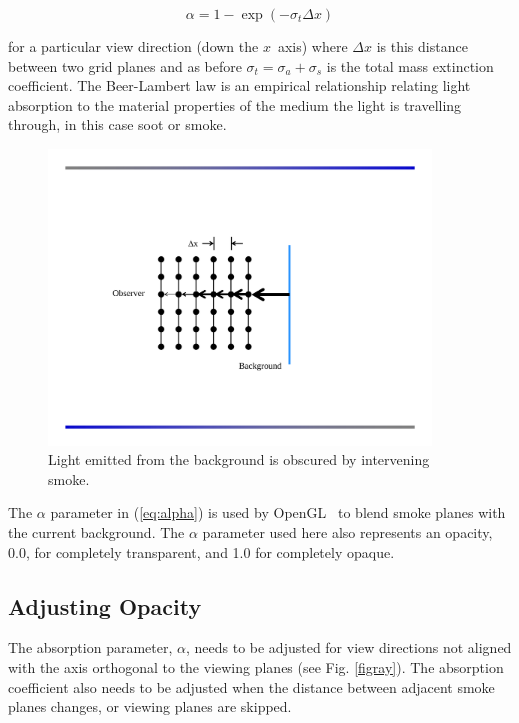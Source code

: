 {\begin{equation}
\label{eq:alpha}
\alpha=1-\exp(-\sigma_t\Delta x)
\end{equation}

\noindent for a particular view direction (down the $x$~axis)
where $\Delta x$ is this distance between two grid planes and as
before $\sigma_t=\sigma_a+\sigma_s$ is the total mass extinction
coefficient.  The Beer-Lambert law is an empirical relationship
relating light absorption to the material properties of the medium
the light is travelling through, in this case soot or smoke.

\begin{figure}[\figoptions]
\begin{center}
\includegraphics[width=4.0in]{FIGURES/smoke_setup}
\end{center}
\caption[Light emitted from the background is obscured by intervening smoke.]
{Light emitted from the background is obscured by intervening smoke.
}
\label{figsmokesetup}
\end{figure}

The $\alpha$ parameter in (\ref{eq:alpha}) is used by
OpenGL~\cite{OpenGLRed} to blend smoke planes with the current
background.  The $\alpha$ parameter used here also represents an
opacity, 0.0, for completely transparent, and 1.0 for completely
opaque.


\subsection{Adjusting Opacity}

The absorption parameter, $\alpha$, needs to be adjusted for view
directions not aligned with the axis orthogonal to the viewing
planes (see Fig. \ref{figray}).  The absorption coefficient also
needs to be adjusted when the distance between adjacent smoke
planes changes, or viewing planes are skipped.

}

